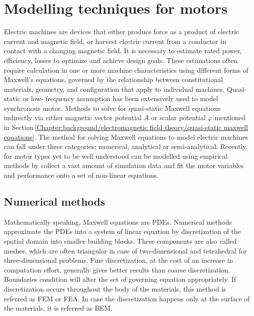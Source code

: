 \section{Modelling techniques for motors}           \label{Chapter:background/modelling techniques for designing motors}


    Electric machines are devices that either produce force as a product of electric current and magnetic field, or harvest electric current from a conductor in contact with a changing magnetic field. It is necessary to estimate rated power, efficiency, losses to optimize and achieve design goals. These estimations often require calculation in one or more machine characteristics using different forms of Maxwell’s equations, governed by the relationship between constitutional materials, geometry, and configuration that apply to individual machines. Quasi-static or low- frequency assumption has been extensively used to model synchronous motor. Methods to solve for quasi-static Maxwell equations indirectly via either magnetic vector potential $A$ or scalar potential $\varphi$ mentioned in Section\,\ref{Chapter:background/electromagnetic field theory/quasi-static maxwell equations}. The method for solving Maxwell equations to model electric machines can fall under three categories: numerical, analytical or semi-analytical. Recently, for motor types yet to be well understood can be modelled using empirical methods by collect a vast amount of simulation data and fit the motor variables and performance onto a set of non-linear equations.


    \subsection{Numerical methods}                  \label{Chapter:background/modelling techniques for designing motors/numerical methods}
    
    
        Mathematically speaking, Maxwell equations are \acsp{PDE}. Numerical methods approximate the \acsp{PDE} into a system of linear equation by discretization of the spatial domain into smaller building blocks. These components are also called meshes, which are often triangular in case of two-dimensional and tetrahedral for three-dimensional problems. Fine discretization, at the cost of an increase in computation effort, generally gives better results than coarse discretization. Boundaries condition will alter the set of governing equation appropriately. If discretization occurs throughout the body of the materials, this method is referred as \ac{FEM} or \ac{FEA}. In case the discretization happens only at the surface of the materials, it is referred as \ac{BEM}. 
        
